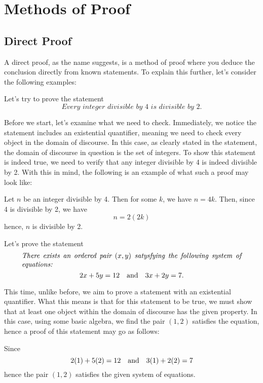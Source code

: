 \section{Methods of Proof}
\subsection{Direct Proof}
A direct proof, as the name suggests, is a method of proof where you deduce the conclusion directly from known statements.
To explain this further, let's consider the following examples:

\begin{ex}
	Let's try to prove the statement
	$$\textit{Every integer divisible by 4 is divisible by 2.}$$
	
	Before we start, let's examine what we need to check.
	Immediately, we notice the statement includes an existential quantifier, meaning we need to check every object in the domain of discourse.
	In this case, as clearly stated in the statement, the domain of discourse in question is the set of integers.
	To show this statement is indeed true, we need to verify that any integer divisible by 4 is indeed divisible by 2.
	With this in mind, the following is an example of what such a proof may look like:
	\begin{block}
		Let $n$ be an integer divisible by 4.
		Then for some $k$, we have $n=4k$.
		Then, since 4 is divisible by 2, we have
		$$n=2(2k)$$
		hence, $n$ is divisible by 2.
	\end{block}	
\end{ex}

\begin{ex}
	Let's prove the statement
	$$\parbox{0.9\linewidth}{\begin{em}There exists an ordered pair $(x,y)$ satysfying the following system of equations:\end{em}}$$
	$$2x+5y=12 \quad\text{and}\quad 3x+2y=7.$$
	
	This time, unlike before, we aim to prove a statement with an existential quantifier.
	What this means is that for this statement to be true, we must show that at least one object within the domain of discourse has the given property.
	In this case, using some basic algebra, we find the pair $(1,2)$ satisfies the equation, hence a proof of this statement may go as follows:
	\begin{block}
		Since
		$$2(1)+5(2)=12 
		\quad\text{and}\quad
		3(1)+2(2)=7$$
		hence the pair $(1,2)$ satisfies the given system of equations.\footnotemark
	\end{block}
\end{ex}

